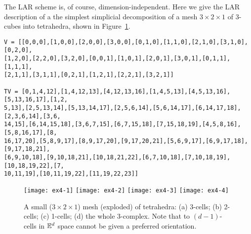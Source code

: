 \begin{example} %
The LAR scheme is, of course, dimension-independent. Here we give the LAR description of a the simplest simplicial decomposition of a mesh $3\times 2\times 1$ of 3-cubes into tetrahedra, shown in Figure~\ref{fig:ex4}.

\begin{verbatim}
V = [[0,0,0],[1,0,0],[2,0,0],[3,0,0],[0,1,0],[1,1,0],[2,1,0],[3,1,0],[0,2,0],
[1,2,0],[2,2,0],[3,2,0],[0,0,1],[1,0,1],[2,0,1],[3,0,1],[0,1,1],[1,1,1],
[2,1,1],[3,1,1],[0,2,1],[1,2,1],[2,2,1],[3,2,1]]

TV = [0,1,4,12],[1,4,12,13],[4,12,13,16],[1,4,5,13],[4,5,13,16],[5,13,16,17],[1,2,
5,13],[2,5,13,14],[5,13,14,17],[2,5,6,14],[5,6,14,17],[6,14,17,18],[2,3,6,14],[3,6,
14,15],[6,14,15,18],[3,6,7,15],[6,7,15,18],[7,15,18,19],[4,5,8,16],[5,8,16,17],[8,
16,17,20],[5,8,9,17],[8,9,17,20],[9,17,20,21],[5,6,9,17],[6,9,17,18],[9,17,18,21],
[6,9,10,18],[9,10,18,21],[10,18,21,22],[6,7,10,18],[7,10,18,19],[10,18,19,22],[7,
10,11,19],[10,11,19,22],[11,19,22,23]]
\end{verbatim}


\begin{figure}[htbp] 
   \centering
   \texttt{[image: ex4-1]} 
   \texttt{[image: ex4-2]} 
   \texttt{[image: ex4-3]} 
   \texttt{[image: ex4-4]} 
   \caption{A small ($3\times 2\times 1$) mesh (exploded) of tetrahedra: (a) 3-cells; (b) 2-cells; (c) 1-cells; (d) the whole 3-complex. Note that to $(d-1)$-cells in $\mathbb{E}^d$ space cannot be given a preferred orientation.}
   \label{fig:ex4}
\end{figure}


\end{example}
